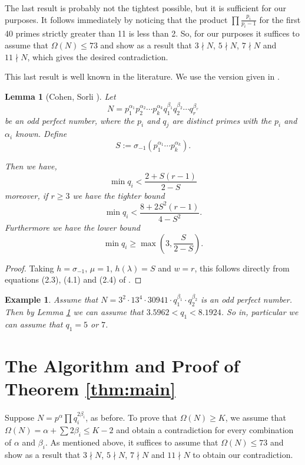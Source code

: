 \documentclass{article}
\newtheorem{lem}[thm]{Lemma}
\newtheorem{ex}[thm]{Example}
\newcommand{\sii} {\sigma_{-1}}
\begin{document}
The last result is probably not the tightest possible, but it is sufficient
    for our purposes.
It follows immediately by noticing that the product $\prod \frac{p_i}{p_i-1}$ 
    for the first 40 primes strictly greater than 11 is less than 2.
So, for our purposes it suffices to assume that $\Omega(N) \leq 73$ and 
    show as a result that $3\nmid N$, $5\nmid N$, $7\nmid N$ and
    $11 \nmid N$, which gives the desired contradiction.

This last result is well known in the literature.  
We use the version given in \cite{CohenSorli03}.  \nocite{Pomerance74}

\begin{lem}[Cohen, Sorli \cite{CohenSorli03}] \label{lem:Carl}
    Let 
    \[N = p_1^{\alpha_1} p_2^{\alpha_2} \cdots p_k^{\alpha_k}
          q_1^{\beta_1} q_2^{\beta_2} \cdots q_r^{\beta_r} \]
    be an odd perfect number, where the $p_i$ and $q_j$ are distinct primes with
    the $p_i$ and $\alpha_i$ known.
    Define \[ S := \sii\left(p_1^{\alpha_1} \cdots p_k^{\alpha_k}\right). \]

    Then we have,  
    \[ \min q_i < \frac{2 + S (r-1)}{2-S}\]
    moreover, if $r \geq 3$ we have the tighter bound 
    \[ \min q_i < \frac{8 + 2 S^2 (r-1)}{4 - S^2}. \]
    Furthermore we have the lower bound 
    \[ \min q_i \geq \max\left(3, \frac{S}{2 - S}\right). \]
\end{lem}

\begin{proof}
Taking $h = \sii$, $\mu = 1$, $h(\lambda) = S$ and $w = r$, this follows 
    directly from equations (2.3), (4.1) and (2.4) of \cite{CohenSorli03}.
\end{proof}

\begin{ex}
Assume that 
    $N = 3^2\cdot 13^4\cdot 30941 \cdot q_1^{\beta_1} \cdot q_2^{\beta_2}$
    is an odd perfect number.
Then by Lemma \ref{lem:Carl} we can assume that $3.5962 < q_1 < 8.1924$.
So in, particular we can assume that $q_1 = 5$ or $7$.
\end{ex}

\section{The Algorithm and Proof of Theorem \ref{thm:main}}%

Suppose $N = p^{\alpha}\prod q_i^{2 \beta_i}$, as before.
To prove that $\Omega(N) \geq K$, we assume that $\Omega(N) =
    \alpha + \sum 2 \beta_i \leq K-2$ and obtain a contradiction 
    for every combination of $\alpha$ and $\beta_i$.
As mentioned above, it suffices to assume that $\Omega(N) \leq 73$ and 
    show as a result that $3\nmid N$, $5\nmid N$, $7\nmid N$ and
    $11 \nmid N$ to obtain our contradiction.
\end{document}
